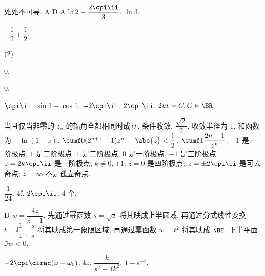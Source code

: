 \begin{multicols}{2}
\begin{exerciseanswer}
  \exans 处处不可导.
  \exans A
  \exans D
  \exans A
  \exans $\ln 2-\dfrac{2\cpi\ii}3$.
  \exans $\ln 3$.
\end{exerciseanswer}

\begin{exerciseanswer}
  \exans $-\dfrac12+\dfrac\ii2$.
  \begin{exanslist}(2)
    \item $0$.
    \item $0$.
  \end{exanslist}
  \exans $\cpi\ii$.
  \exans $\sin1-\cos 1$.
  \exans $-2\cpi\ii$.
  \exans $2\cpi\ii$.
  \exans $2uv+C,C\in\BR$.
\end{exerciseanswer}

\begin{exerciseanswer}
  \exans 当且仅当非零的 $z_n$ 的辐角全都相同时成立.
  \exans 条件收敛.
  \exans $\dfrac{\sqrt2}2$.
  \exans 收敛半径为 $1$, 和函数为 $-\ln(1-z)$.
  \exans $\sumf0(2^{n+1}-1)z^n,\quad \abs{z}<\dfrac12$.
  \exans $\sumf1 \dfrac{2n-1}{z^n}$.
  \exans $-1$ 是一阶极点, $1$ 是二阶极点.
  \exans $1$ 是二阶极点, $0$ 是一阶极点, $-1$ 是三阶极点.
  \exans $z=2k\cpi\ii $ 是一阶极点, $k\neq 0,\pm1$; $z=0$ 是四阶极点; $z=\pm 2\cpi\ii $ 是可去奇点; $z=\infty$ 不是孤立奇点.
\end{exerciseanswer}

\begin{exerciseanswer}
  \exans $\dfrac1{24}$.
  \exans $4\ii$.
  \exans $2\cpi\ii$.
  \exans $4$ 个.
\end{exerciseanswer}

\begin{exerciseanswer}
  \exans D
  \exans $w=\dfrac{4z}{z-1}$.
  \exans 先通过幂函数 $s=\sqrt z$ 将其映成上半圆域, 再通过分式线性变换 $t=\ii\dfrac{1-s}{1+s}$ 将其映成第一象限区域, 再通过幂函数 $w=t^2$ 将其映成 $\BH$.
  \exans 下半平面 $\Im w<0$.
\end{exerciseanswer}

\begin{exerciseanswer}
  \exans $-2\cpi\dirac(\omega+\omega_0)$.
  \exans $\ii\omega$.
  \exans $\dfrac{k}{s^2+4k^2}$.
  \exans $1-e^{-t}$.
\end{exerciseanswer}

\end{multicols}
